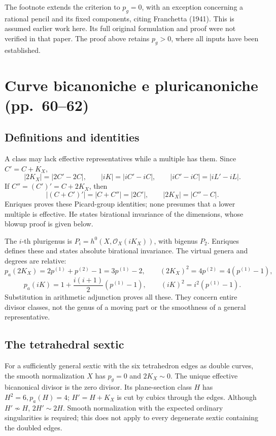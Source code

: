 The footnote extends the criterion to \(p_g=0\), with an exception concerning a rational pencil and its fixed components, citing Franchetta (1941). This is assumed earlier work here. Its full original formulation and proof were not verified in that paper. The proof above retains \(p_g>0\), where all inputs have been established.

\section[Curve pluricanoniche]{Curve bicanoniche e pluricanoniche (pp.~60--62)}\label{commentary-II-8}

\subsection{Definitions and identities}

A class may lack effective representatives while a multiple has them. Since \(C'=C+K_X\), \[
|2K_X|=|2C'-2C|,\qquad |iK|=|iC'-iC|,
\qquad |iC'-iC|=|iL'-iL|.
\] If \(C''=(C')'=C+2K_X\), then \[
|(C+C')'|=|C+C''|=|2C'|,\qquad |2K_X|=|C''-C|.
\] Enriques proves these Picard-group identities; none presumes that a lower multiple is effective. He states birational invariance of the dimensions, whose blowup proof is given below.

The \(i\)-th plurigenus is \(P_i=h^0(X,\mathcal O_X(iK_X))\), with bigenus \(P_2\). Enriques defines these and states absolute birational invariance. The virtual genera and degrees are relative: \[
p_a(2K_X)=2p^{(1)}+p^{(2)}-1=3p^{(1)}-2,\qquad
(2K_X)^2=4p^{(2)}=4(p^{(1)}-1),
\] \[
p_a(iK)=1+\frac{i(i+1)}2(p^{(1)}-1),\qquad
(iK)^2=i^2(p^{(1)}-1).
\] Substitution in arithmetic adjunction proves all these. They concern entire divisor classes, not the genus of a moving part or the smoothness of a general representative.

\subsection{The tetrahedral sextic}

For a sufficiently general sextic with the six tetrahedron edges as double curves, the smooth normalization \(X\) has \(p_g=0\) and \(2K_X\sim0\). The unique effective bicanonical divisor is the zero divisor. Its plane-section class \(H\) has \(H^2=6,p_a(H)=4\); \(H'=H+K_X\) is cut by cubics through the edges. Although \(H'\not\sim H\), \(2H'\sim2H\). Smooth normalization with the expected ordinary singularities is required; this does not apply to every degenerate sextic containing the doubled edges.

